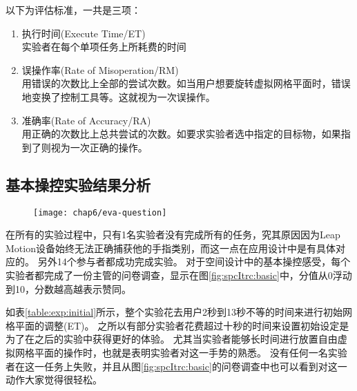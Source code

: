以下为评估标准，一共是三项：
\begin{enumerate}
\item 执行时间(Execute Time/ET) \hfill \\
实验者在每个单项任务上所耗费的时间
\item 误操作率(Rate of Misoperation/RM) \hfill \\
用错误的次数比上全部的尝试次数。如当用户想要旋转虚拟网格平面时，错误地变换了控制工具等。这就视为一次误操作。
\item 准确率(Rate of Accuracy/RA) \hfill \\
用正确的次数比上总共尝试的次数。如要求实验者选中指定的目标物，如果指到了则视为一次正确的操作。
\end{enumerate}

\subsection{基本操控实验结果分析}

\begin{figure}[!htp]
  \centering
  \texttt{[image: chap6/eva-question]}
\end{figure}

在所有的实验过程中，只有1名实验者没有完成所有的任务，究其原因因为Leap Motion设备始终无法正确捕获他的手指类别，而这一点在应用设计中是有具体对应的。
另外14个参与者都成功完成实验。
对于空间设计中的基本操控感受，每个实验者都完成了一份主管的问卷调查，显示在图\ref{fig:spcItrc:basic}中，分值从0浮动到10，分数越高越表示赞同。


如表\ref{table:exp:initial}所示，整个实验花去用户2秒到13秒不等的时间来进行初始网格平面的调整(ET)。
之所以有部分实验者花费超过十秒的时间来设置初始设定是为了在之后的实验中获得更好的体验。
尤其当实验者能够长时间进行放置自由虚拟网格平面的操作时，也就是表明实验者对这一手势的熟悉。
没有任何一名实验者在这一任务上失败，并且从图\ref{fig:spcItrc:basic}的问卷调查中也可以看到对这一动作大家觉得很轻松。


